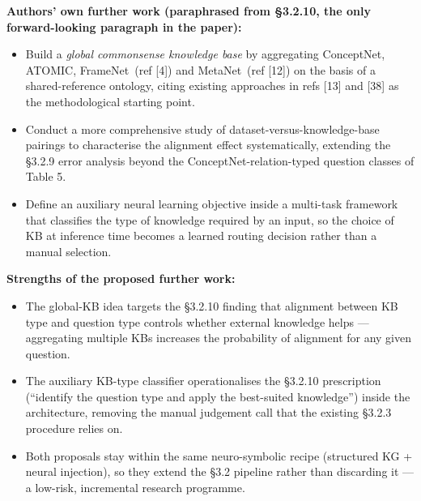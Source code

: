 \documentclass[11pt, a4paper]{article}
\begin{document}
\textbf{Authors' own further work (paraphrased from §3.2.10, the only forward-looking paragraph in the paper):}
\begin{itemize}
  \item Build a \emph{global commonsense knowledge base} by aggregating ConceptNet, ATOMIC, FrameNet~(ref [4]) and MetaNet~(ref [12]) on the basis of a shared-reference ontology, citing existing approaches in refs [13] and [38] as the methodological starting point.
  \item Conduct a more comprehensive study of dataset-versus-knowledge-base pairings to characterise the alignment effect systematically, extending the §3.2.9 error analysis beyond the ConceptNet-relation-typed question classes of Table 5.
  \item Define an auxiliary neural learning objective inside a multi-task framework that classifies the type of knowledge required by an input, so the choice of KB at inference time becomes a learned routing decision rather than a manual selection.
\end{itemize}

\textbf{Strengths of the proposed further work:}
\begin{itemize}
  \item The global-KB idea targets the §3.2.10 finding that alignment between KB type and question type controls whether external knowledge helps — aggregating multiple KBs increases the probability of alignment for any given question.
  \item The auxiliary KB-type classifier operationalises the §3.2.10 prescription (``identify the question type and apply the best-suited knowledge'') inside the architecture, removing the manual judgement call that the existing §3.2.3 procedure relies on.
  \item Both proposals stay within the same neuro-symbolic recipe (structured KG + neural injection), so they extend the §3.2 pipeline rather than discarding it — a low-risk, incremental research programme.
\end{itemize}
\end{document}
